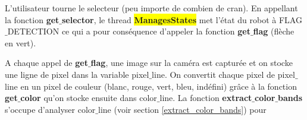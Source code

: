 \documentclass{article}
\begin{document}
    L'utilisateur tourne le selecteur (peu importe de combien de cran). En appellant la fonction \textbf{get$\_$selector}, le thread \colorbox{yellow}{\textbf{ManagesStates}} met l'état du robot à \textcolor{bleu}{FLAG$\_$DETECTION} ce qui a pour conséquence d'appeler la fonction \textbf{get$\_$flag} (\textcolor{vert}{flèche en vert}). \par
    
    A chaque appel de \textbf{get$\_$flag}, une image sur la caméra est capturée et on stocke une ligne de pixel dans la variable \textcolor{bleu}{pixel$\_$line}. On convertit chaque pixel de \textcolor{bleu}{pixel$\_$line} en un pixel de couleur (blanc, rouge, vert, bleu, indéfini) grâce à la fonction \textbf{get$\_$color} qu'on stocke ensuite dans \textcolor{bleu}{color$\_$line}. La fonction \textbf{extract$\_$color$\_$bands} s'occupe d'analyser \textcolor{bleu}{color$\_$line} (voir section \ref{extract_color_bands}) pour 
\end{document}
